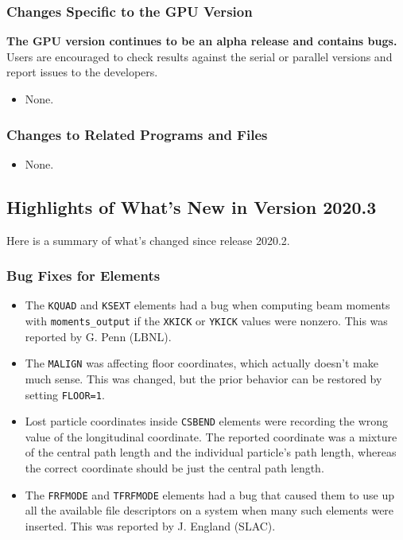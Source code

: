 \documentclass[11pt]{article}
\begin{document}
\subsubsection{Changes Specific to the GPU Version}

{\bf The GPU version continues to be an alpha release and contains bugs.}  Users are encouraged to check results against
the serial or parallel versions and report issues to the developers.

\begin{itemize}
\item None.
\end{itemize}

\subsubsection{Changes to Related Programs and Files}

\begin{itemize}
\item None.
\end{itemize}

\subsection{Highlights of What's New in Version 2020.3}

Here is a summary of what's changed since release 2020.2.

\subsubsection{Bug Fixes for Elements}

\begin{itemize}
\item The \verb|KQUAD| and \verb|KSEXT| elements had a bug when computing beam moments with \verb|moments_output|
  if the \verb|XKICK| or \verb|YKICK| values were nonzero. This was reported by G. Penn (LBNL).
\item The \verb|MALIGN| was affecting floor coordinates, which actually doesn't make much sense. This was changed, but
  the prior behavior can be restored by setting \verb|FLOOR=1|.
\item Lost particle coordinates inside \verb|CSBEND| elements were recording the wrong value of the longitudinal coordinate.
  The reported coordinate was a mixture of the central path length and the individual particle's path length, whereas the
  correct coordinate should be just the central path length.
\item The \verb|FRFMODE| and \verb|TFRFMODE| elements had a bug that caused them to use up all the available
  file descriptors on a system when many such elements were inserted. This was reported by J. England (SLAC).
\end{itemize}
\end{document}

